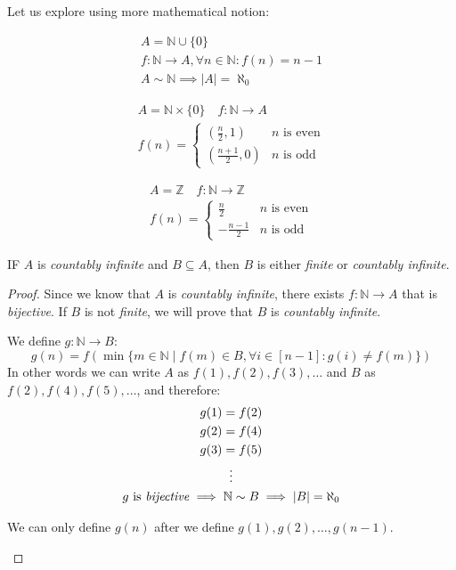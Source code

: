 \documentclass[00_complete]{subfiles}
\begin{document}
Let us explore using more mathematical notion:
\begin{example}
    \begin{gather*}
    A=\mathbb{N}\cup \{0\} \\
    f:\mathbb{N}\to A, \forall n \in \mathbb{N}: f(n)=n-1 \\
    A \sim \mathbb{N} \implies |A|=\aleph_0
    \end{gather*}
\end{example}
\begin{example}
    \begin{gather*}
        A=\mathbb{N}\times\{0\} \quad f:\mathbb{N} \to A\\
        f(n) = \begin{cases}
            (\frac{n}{2},1) & \text{$n$ is even} \\
            (\frac{n+1}{2},0) & \text{$n$ is odd}
        \end{cases}
    \end{gather*}
\end{example}
\begin{example}
    \begin{gather*}
        A=\mathbb{Z} \quad f:\mathbb{N}\to\mathbb{Z} \\
        f(n) = \begin{cases}
            \frac{n}{2} & \text{$n$ is even} \\
            -\frac{n-1}{2} & \text{$n$ is odd}
        \end{cases}
    \end{gather*}
\end{example}
\begin{claim}
    IF $A$ is \emph{countably infinite} and $B \subseteq A$, then $B$
    is either \emph{finite} or \emph{countably infinite}.
\end{claim}
\begin{proof}
    Since we know that $A$ is \emph{countably infinite}, there exists
    $f:\mathbb{N}\to A$ that is \emph{bijective}. If $B$ is not \emph{finite},
    we will prove that $B$ is \emph{countably infinite}.

    We define $g:\mathbb{N}\to B$:
    $$g(n)=f(\min\{m\in\mathbb{N} \mid f(m) \in B, \forall i\in [n-1]: g(i)\neq
    f(m)\})$$
    In other words we can write $A$ as $f(1),f(2),f(3),\dots$ and $B$ as
    $f(2),f(4),f(5),\dots$, and therefore:
    \begin{gather*}
        g(1)=f(2) \\ g(2)=f(4) \\ g(3)=f(5) \\ \vdots \\
        g \text{ is \emph{bijective}} \implies \mathbb{N} \sim B \implies
        |B|=\aleph_0
    \end{gather*}
\begin{note}
    We can only define $g(n)$ after we define $g(1),g(2),\dots,g(n-1)$.
\end{note}
\end{proof}
\end{document}
